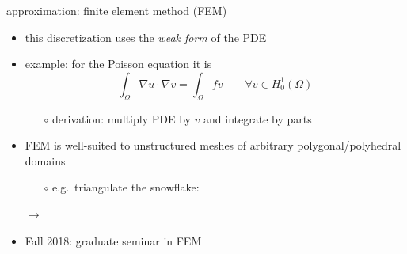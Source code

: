 \documentclass[hide notes,intlimits,usenames,dvipsnames]{beamer}
\newcommand{\grad}{\nabla}
\begin{document}
\begin{frame}{approximation: finite element method (FEM)}
\begin{itemize}
\item this discretization uses the \emph{weak form} of the PDE
\item example: for the Poisson equation it is
    $$\int_\Omega \grad u \cdot \grad v = \int_\Omega f v \qquad \forall v \in H_0^1(\Omega)$$
    \vspace{-4mm}
	\begin{itemize}
	\item[$\circ$] derivation: multiply PDE by $v$ and integrate by parts
	\end{itemize}
\item FEM is well-suited to unstructured meshes of arbitrary polygonal/polyhedral domains
	\begin{itemize}
	\item[$\circ$] e.g.~triangulate the snowflake:
	\end{itemize}

\begin{center}
\begin{tikzpicture}[scale=1.3,baseline]  \end{tikzpicture}
\qquad $\to$ \qquad
\begin{tikzpicture}[scale=1.3,baseline]  \end{tikzpicture}
\end{center}

\footnotesize
\item \alert{Fall 2018: graduate seminar in FEM}
\end{itemize}
\end{frame}
\end{document}
